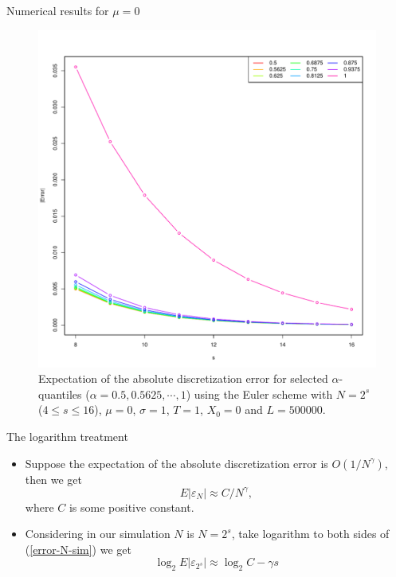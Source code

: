\documentclass[cjk,10pt]{beamer}
\begin{document}
%

\begin{frame}{Numerical results for $\mu=0$}
\begin{figure}
   \includegraphics[scale=0.3]{nout_0a.pdf}
   \caption{Expectation of the absolute discretization error for selected $\alpha$-quantiles ($\alpha = 0.5, 0.5625, \cdots, 1$) using the Euler scheme with $N = 2^s$ ($4\le s \le 16$), $\mu=0$, $\sigma=1$, $T=1$, $X_0=0$ and $L=500000$. }
\label{f:ab}
\end{figure}
\end{frame}

\begin{frame}{The logarithm treatment}
\begin{itemize}
\item
Suppose the expectation of the absolute discretization error is $O(1/N^\gamma)$, then we get
\begin{equation}\label{error-N-sim}
E|\varepsilon_N| \approx C/N^\gamma,
\end{equation}
where $C$ is some positive constant. 
\item
Considering in our simulation $N$ is $N = 2^s$, take logarithm to both sides of (\ref{error-N-sim}) we get
\begin{equation}
\log_2 E|\varepsilon_{2^s}| \approx \log_2 C -\gamma s
\end{equation}
\end{itemize}
\end{frame}
\end{document}
